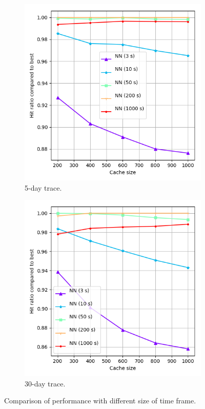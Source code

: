 \begin{figure}[t!]
	\centering
	
	\begin{subfigure}[b]{0.49\linewidth}
		\includegraphics[width=\linewidth]{pics/cache6.png}
		\caption{5-day trace.}
	\end{subfigure}
	\begin{subfigure}[b]{0.49\linewidth}
		\includegraphics[width=\linewidth]{pics/cache6_2.png}
		\caption{30-day trace.}
	\end{subfigure}
	\caption{Comparison of performance with different size of time frame.}
	\label{fig:cache6}
\end{figure}

